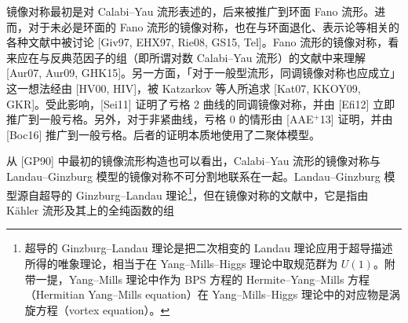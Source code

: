镜像对称最初是对 Calabi–Yau 流形表述的，后来被推广到环面 Fano 流形。进而，对于未必是环面的 Fano 流形的镜像对称，也在与环面退化、表示论等相关的各种文献中被讨论 [Giv97, EHX97, Rie08, GS15, Tel]。Fano 流形的镜像对称，看来应在与反典范因子的组（即所谓对数 Calabi–Yau 流形）的文献中来理解 [Aur07, Aur09, GHK15]。另一方面，「对于一般型流形，同调镜像对称也应成立」这一想法经由 [HV00, HIV]，被 Katzarkov 等人所追求 [Kat07, KKOY09, GKR]。受此影响，[Sei11] 证明了亏格 2 曲线的同调镜像对称，并由 [Efi12] 立即推广到一般亏格。另外，对于非紧曲线，亏格 0 的情形由 [AAE$^{+}$13] 证明，并由 [Boc16] 推广到一般亏格。后者的证明本质地使用了二聚体模型。

从 [GP90] 中最初的镜像流形构造也可以看出，Calabi–Yau 流形的镜像对称与 Landau–Ginzburg 模型的镜像对称不可分割地联系在一起。Landau–Ginzburg 模型源自超导的 Ginzburg–Landau 理论\footnote{超导的 Ginzburg–Landau 理论是把二次相变的 Landau 理论应用于超导描述所得的唯象理论，相当于在 Yang–Mills–Higgs 理论中取规范群为 $U(1)$。附带一提，Yang–Mills 理论中作为 BPS 方程的 Hermite–Yang–Mills 方程（Hermitian Yang–Mills equation）在 Yang–Mills–Higgs 理论中的对应物是涡旋方程（vortex equation）。}，但在镜像对称的文献中，它是指由 Kähler 流形及其上的全纯函数的组

